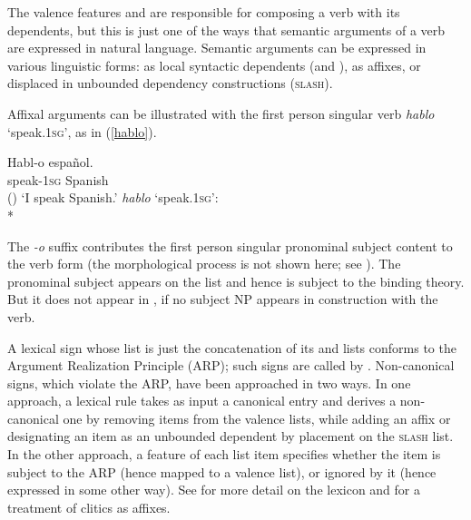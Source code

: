 \documentclass[output=paper
 	        ,biblatex
                ,babelshorthands
                ,newtxmath
                ,draftmode
                ,colorlinks, citecolor=brown
]{langscibook}
\begin{document}
The valence features \subj and \comps are responsible for composing a verb with its dependents, but
this is just one of the ways that semantic arguments of a verb are expressed in natural language.
Semantic arguments can be expressed in various linguistic forms: as local syntactic dependents
(\subj and \comps), as affixes, or displaced in unbounded dependency constructions (\textsc{slash}).

Affixal arguments can be illustrated with the first person singular  verb
\textit{hablo} `speak.\textsc{1sg}', as in (\ref{hablo}).


\begin{exe} 
\ex	
\label{hablo}
\begin{xlist}
\ex
\gll Habl-o espa\~{n}ol.  \\
     speak-\textsc{1sg} Spanish  \\\hfill()
\glt `I speak Spanish.'
\ex \textit{hablo} `speak.\textsc{1sg}': \\*
\end{xlist}
\end{exe}

\noindent
The \textit{-o} suffix contributes the first person singular pronominal subject content to the verb
form (the morphological process is not shown here; see ).  The
pronominal subject appears on the \argst list and hence is subject to the binding theory.  But it
does not appear in \subj, if no subject NP appears in construction with the verb.

A lexical sign whose \argst list is just the concatenation of its \subj and \comps lists conforms to
the Argument Realization Principle (ARP); such signs are called
 by \citet{Boumaetal2001}.  Non-canonical signs, which
violate the ARP, have been approached in two ways.  In one approach, a lexical rule takes as input a
canonical entry and derives a non-canonical one by removing items from the valence lists, while
adding an affix or designating an item as an unbounded dependent by placement on the \textsc{slash}
list. In the other
approach, a feature of each \argst list item specifies whether the item is subject to the ARP (hence
mapped to a valence list), or ignored by it (hence expressed in some other way).  See
   for more detail on the lexicon and \citet{MillerandSag1997} for a
  treatment of  clitics as affixes.
\end{document}
